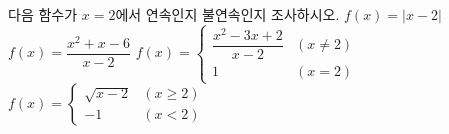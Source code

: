 다음 함수가 $x=2$에서 연속인지 불연속인지 조사하시오.
 $f(x)=|x-2|$
 $f(x)=\dfrac{x^2+x-6}{x-2}$
 $f(x)=\begin{cases} \dfrac{x^2-3x+2}{x-2} & (x\ne 2) \\ 1 & (x=2) \end{cases}$
 $f(x)=\begin{cases} \sqrt{x-2} & (x\ge 2) \\ -1 & (x<2) \end{cases}$
